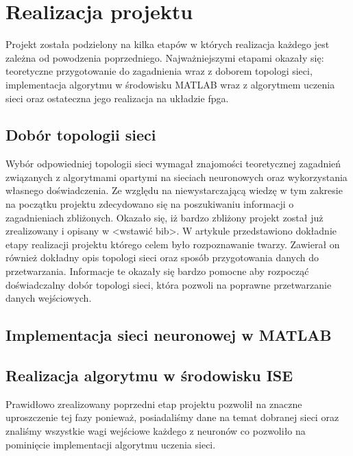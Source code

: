 \chapter{Realizacja projektu}
\label{cha:realizacja}
Projekt została podzielony na kilka etapów w których realizacja każdego jest zależna od powodzenia poprzedniego. Najważniejszymi etapami okazały się: teoretyczne przygotowanie do zagadnienia wraz z doborem topologi sieci, implementacja algorytmu w środowisku MATLAB wraz z algorytmem uczenia sieci oraz ostateczna jego realizacja na układzie fpga. 
\section{Dobór topologii sieci}
Wybór odpowiedniej topologii sieci wymagał znajomości teoretycznej zagadnień związanych z algorytmami opartymi na sieciach neuronowych oraz wykorzystania własnego doświadczenia. Ze względu na niewystarczającą wiedzę w tym zakresie na początku projektu zdecydowano się na poszukiwaniu informacji o zagadnieniach zbliżonych. Okazało się, iż bardzo zbliżony projekt został już zrealizowany i opisany w <wstawić bib>. W artykule przedstawiono dokładnie etapy realizacji projektu którego celem było rozpoznawanie twarzy. Zawierał on również dokładny opis topologi sieci oraz sposób przygotowania danych do przetwarzania. 
Informacje te okazały się bardzo pomocne aby rozpocząć doświadczalny dobór topologi sieci, która pozwoli na poprawne przetwarzanie danych wejściowych. 
\section{Implementacja sieci neuronowej w MATLAB}

\section{Realizacja algorytmu w środowisku ISE}
Prawidłowo zrealizowany poprzedni etap projektu pozwolił na znaczne uproszczenie tej fazy ponieważ, posiadaliśmy dane na temat dobranej sieci oraz znaliśmy wszystkie wagi wejściowe każdego z neuronów co pozwoliło na pominięcie implementacji algorytmu uczenia sieci.


